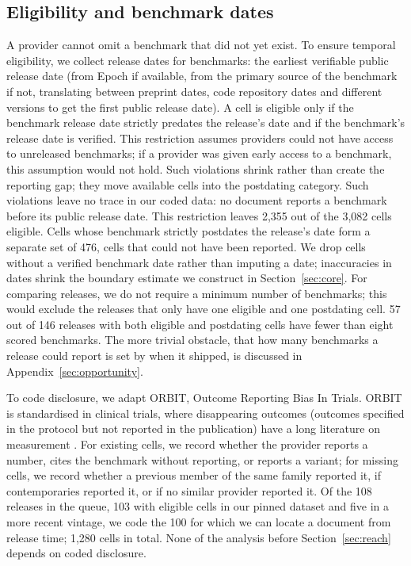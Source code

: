 \documentclass{article}
\begin{document}
\subsection{Eligibility and benchmark dates}\label{sec:data-gate}

A provider cannot omit a benchmark that did not yet exist. To ensure temporal eligibility, we collect release dates for benchmarks: the earliest verifiable public release date (from Epoch if available, from the primary source of the benchmark if not, translating between preprint dates, code repository dates and different versions to get the first public release date). A cell is eligible only if the benchmark release date strictly predates the release's date and if the benchmark's release date is verified. This restriction assumes providers could not have access to unreleased benchmarks; if a provider was given early access to a benchmark, this assumption would not hold. Such violations shrink rather than create the reporting gap; they move available cells into the postdating category. Such violations leave no trace in our coded data: no document reports a benchmark before its public release date. This restriction leaves 2,355 out of the 3,082 cells eligible. Cells whose benchmark strictly postdates the release's date form a separate set of 476, cells that could not have been reported. We drop cells without a verified benchmark date rather than imputing a date; inaccuracies in dates shrink the boundary estimate we construct in Section~\ref{sec:core}. For comparing releases, we do not require a minimum number of benchmarks; this would exclude the releases that only have one eligible and one postdating cell. 57 out of 146 releases with both eligible and postdating cells have fewer than eight scored benchmarks. The more trivial obstacle, that how many benchmarks a release could report is set by when it shipped, is discussed in Appendix~\ref{sec:opportunity}.

To code disclosure, we adapt ORBIT, Outcome Reporting Bias In Trials. ORBIT is standardised in clinical trials, where disappearing outcomes (outcomes specified in the protocol but not reported in the publication) have a long literature on measurement \citep{chan2004,kirkham2010,dwan2013}. For existing cells, we record whether the provider reports a number, cites the benchmark without reporting, or reports a variant; for missing cells, we record whether a previous member of the same family reported it, if contemporaries reported it, or if no similar provider reported it. Of the 108 releases in the queue, 103 with eligible cells in our pinned dataset and five in a more recent vintage, we code the 100 for which we can locate a document from release time; 1,280 cells in total. None of the analysis before Section~\ref{sec:reach} depends on coded disclosure.
\end{document}
